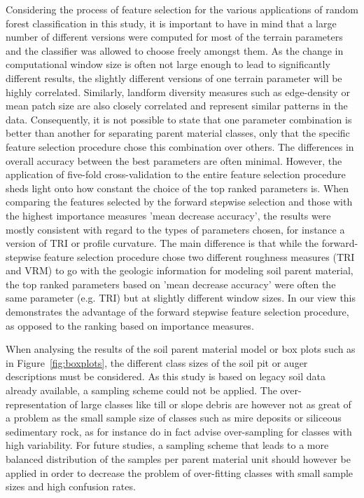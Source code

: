 \documentclass[preprint,12pt,authoryear]{elsarticle}
\begin{document}
Considering the process of feature selection for the various applications of random forest classification in this study, it is important to have in mind that a large number of different versions were computed for most of the terrain parameters and the classifier was allowed to choose freely amongst them. As the change in computational window size is often not large enough to lead to significantly different results, the slightly different versions of one terrain parameter will be highly correlated. Similarly, landform diversity measures such as edge-density or mean patch size are also closely correlated and represent similar patterns in the data.  Consequently, it is not possible to state that one parameter combination is better than another for separating parent material classes, only that the specific feature selection procedure chose this combination over others. The differences in overall accuracy  between the best parameters are often minimal. However, the application of five-fold cross-validation to the entire feature selection procedure sheds light onto how constant the choice of the top ranked parameters is. When comparing the features selected by the forward stepwise selection and those with the highest importance measures 'mean decrease accuracy', the results were mostly consistent with regard to the types of parameters chosen, for instance a version of TRI or profile curvature. The main difference is that while the forward-stepwise feature selection procedure chose two different roughness measures (TRI and VRM) to go with the geologic information for modeling soil parent material, the top ranked parameters based on 'mean decrease accuracy' were often the same parameter (e.g. TRI) but at slightly different window sizes. In our view this demonstrates the advantage of the forward stepwise feature selection procedure, as opposed to the ranking based on importance measures.

When analysing the results of the soil parent material model or box plots such as in Figure~\ref{fig:boxplots}, the different class sizes of the soil pit or auger descriptions must be considered. As this study is based on legacy soil data already available, a sampling scheme could not be applied. The over-representation of large classes like till or slope debris are however not as great of a problem as the small sample size of classes such as mire deposits or siliceous sedimentary rock, as for instance \cite{Congalton1991} do in fact advise over-sampling for classes with high variability. 
For future studies, a sampling scheme that leads to a more balanced distribution of the samples per parent material unit should however be applied in order to decrease the problem of over-fitting classes with small sample sizes and high confusion rates. 
\end{document}
